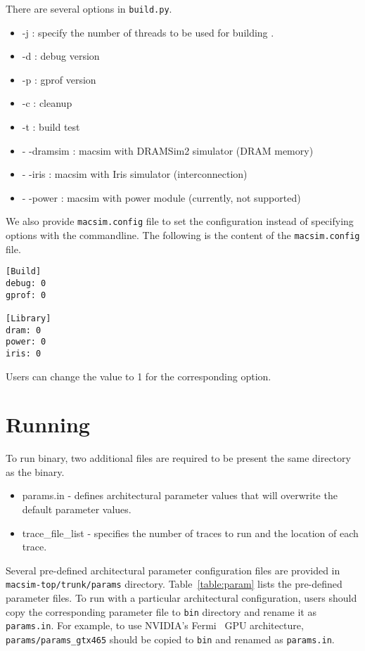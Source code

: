 There are several options in \Verb+build.py+.

\begin{itemize}
  \item -j : specify the number of threads to be used for building \SIM.
  \item -d : debug version
  \item -p : gprof version
  \item -c : cleanup
  \item -t : build test
  \item - -dramsim : macsim with DRAMSim2 simulator (DRAM memory) 
  \item - -iris : macsim with Iris simulator (interconnection)
  \item - -power : macsim with power module (currently, not supported)
\end{itemize}

\noindent
We also provide \Verb+macsim.config+ file to set the configuration instead of specifying options with the commandline. The following is the content of the \Verb+macsim.config+ file.

\begin{Verbatim}
[Build]
debug: 0
gprof: 0

[Library]
dram: 0
power: 0
iris: 0
\end{Verbatim}

\noindent
Users can change the value to 1 for the corresponding option.

\section{Running \SIM}
\label{sec:run}

To run \bin binary, two additional files are required to be present 
the same directory as the binary.

\begin{itemize}
  \item params.in - defines architectural parameter values that will
  overwrite the default parameter values.

  \item trace\_file\_list - specifies the number of traces to run and
  the location of each trace.
\end{itemize}


Several pre-defined architectural parameter configuration files are provided in
\Verb+macsim-top/trunk/params+ directory. Table~\ref{table:param} lists the
pre-defined parameter files. To run \SIM with a particular architectural
configuration, users should copy the corresponding parameter file to \Verb+bin+
directory and rename it as \Verb+params.in+. For example, to use NVIDIA's
Fermi~\cite{fermi} GPU architecture, \Verb+params/params_gtx465+ should be
copied to \Verb+bin+ and renamed as \Verb+params.in+. 



